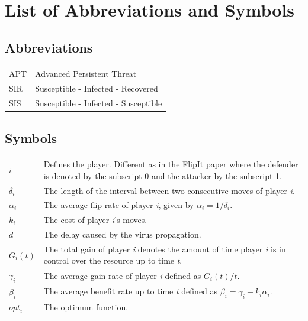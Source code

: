 \documentclass[master=cws, masteroption=vs]{kulemt}
\begin{document}
\chapter{List of Abbreviations and Symbols}
\section*{Abbreviations}
\begin{flushleft}
  \renewcommand{\arraystretch}{1.1}
  \begin{tabularx}{\textwidth}{@{}p{12mm}X@{}}
    APT   & Advanced Persistent Threat \\
    SIR & Susceptible - Infected - Recovered \\
    SIS & Susceptible - Infected - Susceptible \\
  \end{tabularx}
\end{flushleft}
\section*{Symbols}
\begin{flushleft}
  \renewcommand{\arraystretch}{1.1}
  \begin{tabularx}{\textwidth}{@{}p{12mm}X@{}}
 $i$ & Defines the player. Different as in the FlipIt paper where the defender is denoted by the subscript 0 and the attacker by the subscript 1. \\
 $\delta_{i}$ & The length of the interval between two consecutive moves of player \textit{i}. \\
 $\alpha_{i}$ & The average flip rate of player \textit{i}, given by $\alpha_{i}=1/\delta_{i}$. \\
$k_{i}$ & The cost of player \textit{i}'s moves. \\
$d$ & The delay caused by the virus propagation. \\
 $G_{i}(t)$ & The total gain of player \textit{i} denotes the amount of time player \textit{i} is in control over the resource up to time \textit{t}. \\
$\gamma_{i}$ & The average gain rate of player \textit{i} defined as $G_{i}(t)/t$. \\
$\beta_{i}$ &  The average benefit rate up to time \textit{t} defined as  $\beta_{i} = \gamma_{i} -k_{i} \alpha_{i} $. \\
$opt_{i}$ & The optimum function. \\
  \end{tabularx}
\end{flushleft}
\end{document}
